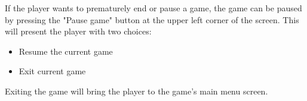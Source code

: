 If the player wants to prematurely end or pause a game, the game can be paused by pressing the "Pause game" button at the upper left corner of the screen. This will present the player with two choices:
\noindent
\begin{itemize}
\item Resume the current game
\item Exit current game
\end{itemize} 
Exiting the game will bring the player to the game's main menu screen. 